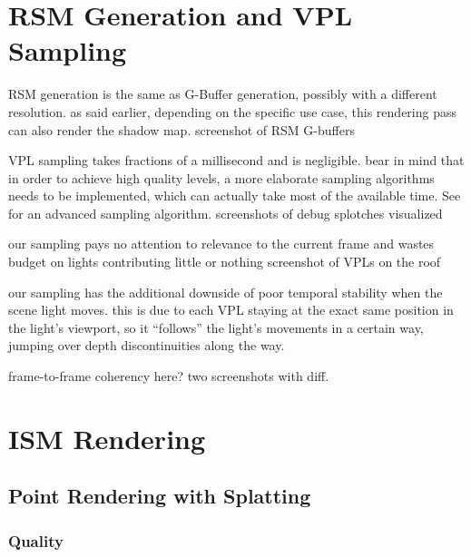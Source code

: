 \section{RSM Generation and VPL Sampling}
\label{sec:results:RsmAndVplSampling}
\begin{outline}
\1 RSM generation is the same as G-Buffer generation, possibly with a different resolution. as said earlier, depending on the specific use case, this rendering pass can also render the shadow map.
\1 screenshot of RSM G-buffers

\1 VPL sampling takes fractions of a millisecond and is negligible. bear in mind that in order to achieve high quality levels, a more elaborate sampling algorithms needs to be implemented, which can actually take most of the available time. See \citep{hedman2016sequential} for an advanced sampling algorithm.
\1 screenshots of debug splotches visualized

\1 our sampling pays no attention to relevance to the current frame and wastes budget on lights contributing little or nothing
\1 screenshot of VPLs on the roof

\1 our sampling has the additional downside of poor temporal stability when the scene light moves. this is due to each VPL staying at the exact same position in the light's viewport, so it ``follows'' the light's movements in a certain way, jumping over depth discontinuities along the way.

\1 frame-to-frame coherency here? two screenshots with diff.
\end{outline}


\section{ISM Rendering}

\subsection{Point Rendering with Splatting}






\subsubsection{Quality}
\label{sec:results:ism:quality}

